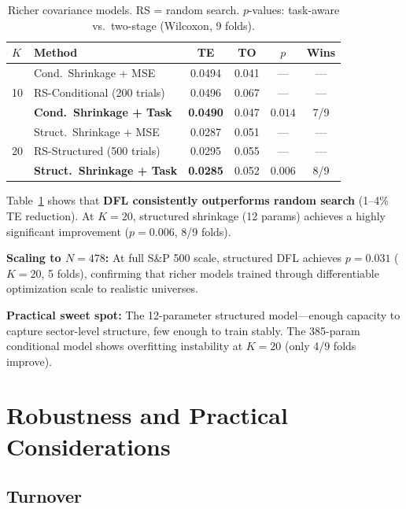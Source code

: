 \documentclass[11pt]{article}
\begin{document}
\begin{table}[t]
\centering
\caption{Richer covariance models. RS = random search. $p$-values: task-aware vs.\ two-stage (Wilcoxon, 9 folds).}
\label{tab:q3}
\small
\begin{tabular}{@{}llcccc@{}}
\toprule
$K$ & Method & TE & TO & $p$ & Wins \\
\midrule
\multirow{3}{*}{10}
& Cond.\ Shrinkage + MSE          & 0.0494 & 0.041 & --- & --- \\
& RS-Conditional (200 trials)      & 0.0496 & 0.067 & --- & --- \\
& \textbf{Cond.\ Shrinkage + Task} & \textbf{0.0490} & 0.047 & $0.014$ & 7/9 \\
\midrule
\multirow{3}{*}{20}
& Struct.\ Shrinkage + MSE         & 0.0287 & 0.051 & --- & --- \\
& RS-Structured (500 trials)       & 0.0295 & 0.055 & --- & --- \\
& \textbf{Struct.\ Shrinkage + Task} & \textbf{0.0285} & 0.052 & $0.006$ & 8/9 \\
\bottomrule
\end{tabular}
\end{table}

Table~\ref{tab:q3} shows that \textbf{DFL consistently outperforms random search} (1--4\% TE reduction). At $K{=}20$, structured shrinkage (12 params) achieves a highly significant improvement ($p = 0.006$, 8/9 folds).

\textbf{Scaling to $N=478$:} At full S\&P 500 scale, structured DFL achieves $p = 0.031$ ($K{=}20$, 5 folds), confirming that richer models trained through differentiable optimization scale to realistic universes.

\textbf{Practical sweet spot:} The 12-parameter structured model---enough capacity to capture sector-level structure, few enough to train stably. The 385-param conditional model shows overfitting instability at $K{=}20$ (only 4/9 folds improve).

\section{Robustness and Practical Considerations}
\label{sec:robustness}

\subsection{Turnover}
\end{document}

